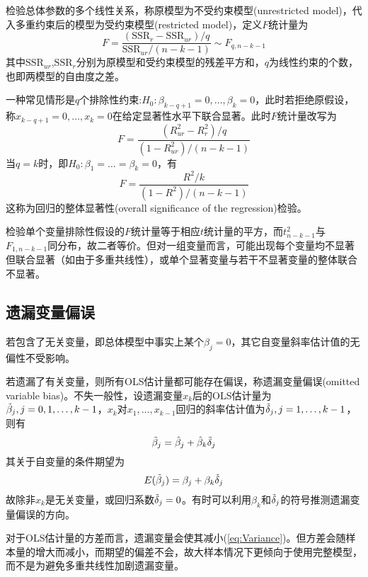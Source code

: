 \par 检验总体参数的多个线性关系，称原模型为不受约束模型(unrestricted model)，代入多重约束后的模型为受约束模型(restricted model)，定义$F$统计量为
\begin{equation}
    F=\frac{(\text{SSR}_r-\text{SSR}_{ur})/q}{\text{SSR}_{ur}/(n-k-1)}\sim F_{q,n-k-1}
\end{equation}
其中$\text{SSR}_{ur}$,$\text{SSR}_{r}$分别为原模型和受约束模型的残差平方和，$q$为线性约束的个数，也即两模型的自由度之差。
\par 一种常见情形是$q$个排除性约束:$H_0:\beta_{k-q+1}=0,\dots,\beta_{k}=0$，此时若拒绝原假设，称$x_{k-q+1}=0,\dots,x_{k}=0$在给定显著性水平下联合显著。此时$F$统计量改写为
\begin{equation}
    F=\frac{(R_{ur}^2-R_{r}^2)/q}{(1-R_{ur}^2)/(n-k-1)}
\end{equation}
当$q=k$时，即$H_0:\beta_1=\dots=\beta_k=0$，有
\begin{equation}
    F=\frac{R^2/k}{(1-R^2)/(n-k-1)}
\end{equation}
这称为回归的整体显著性(overall significance of the regression)检验。

\par 检验单个变量排除性假设的$F$统计量等于相应$t$统计量的平方，而$t_{n-k-1}^2$与$F_{1,n-k-1}$同分布，故二者等价。但对一组变量而言，可能出现每个变量均不显著但联合显著（如由于多重共线性），或单个显著变量与若干不显著变量的整体联合不显著。

\subsection{遗漏变量偏误}

\par 若包含了无关变量，即总体模型中事实上某个$\beta_j=0$，其它自变量斜率估计值的无偏性不受影响。

\par 若遗漏了有关变量，则所有OLS估计量都可能存在偏误，称遗漏变量偏误(omitted variable bias)。不失一般性，设遗漏变量$x_k$后的OLS估计量为$\Tilde{\beta}_j,j=0,1,\dots,k-1$，$x_k$对$x_1,\dots,x_{k-1}$回归的斜率估计值为$\Tilde{\delta}_j,j=1,\dots,k-1$，则有
\begin{equation}
    \Tilde{\beta}_j=\hat{\beta}_j+\hat{\beta}_k\Tilde{\delta}_j
\end{equation}
其关于自变量的条件期望为
\begin{equation}
    E(\Tilde{\beta}_j)=\beta_j+\beta_k\Tilde{\delta}_j
\end{equation}
故除非$x_k$是无关变量，或回归系数$\Tilde{\delta}_j=0$。有时可以利用$\beta_k$和$\Tilde{\delta}_j$的符号推测遗漏变量偏误的方向。
\par 对于OLS估计量的方差而言，遗漏变量会使其减小(\ref{eq:Variance})。但方差会随样本量的增大而减小，而期望的偏差不会，故大样本情况下更倾向于使用完整模型，而不是为避免多重共线性加剧遗漏变量。

